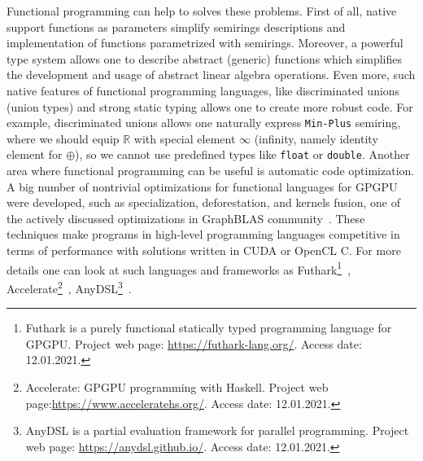 Functional programming can help to solves these problems.
First of all, native support functions as parameters simplify semirings descriptions and implementation of functions parametrized with semirings. 
Moreover, a powerful type system allows one to describe abstract (generic) functions which simplifies the development and usage of abstract linear algebra operations. 
Even more, such native features of functional programming languages, like discriminated unions (union types) and strong static typing allows one to create more robust code.
For example, discriminated unions allows one naturally express \texttt{Min-Plus} semiring, where we should equip $\mathbb{R}$ with special element $\infty$ (infinity, namely identity element for $\oplus$), so we cannot use predefined types like \texttt{float} or \texttt{double}.
Another area where functional programming can be useful is automatic code optimization.
A big number of nontrivial optimizations for functional languages for GPGPU were developed, such as specialization, deforestation, and kernels fusion, one of the actively discussed optimizations in GraphBLAS community~\cite{10.1145/3466795}.
These techniques make programs in high-level programming languages competitive in terms of performance with solutions written in CUDA or OpenCL C. 
For more details one can look at such languages and frameworks as Futhark\footnote{Futhark is a purely functional statically typed programming language for GPGPU. Project web page: \url{https://futhark-lang.org/}. Access date: 12.01.2021.}~\cite{Henriksen:2017:FPF:3062341.3062354}, Accelerate\footnote{Accelerate: GPGPU programming with Haskell. Project web page:\url{https://www.acceleratehs.org/}. Access date: 12.01.2021.}~\cite{10.1145/2544174.2500595}, AnyDSL\footnote{AnyDSL is a partial evaluation framework for parallel programming. Project web page: \url{https://anydsl.github.io/}. Access date: 12.01.2021.}~\cite{10.1145/3276489}.

